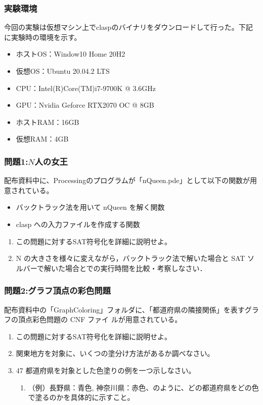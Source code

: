 \documentclass[dvipdfmx]{jsarticle}
\begin{document}
  \subsubsection{実験環境}
  今回の実験は仮想マシン上でclaspのバイナリをダウンロードして行った。下記に実験時の環境を示す。
  \begin{itemize}
    \item ホストOS：Window10 Home 20H2
    \item 仮想OS：Ubuntu 20.04.2 LTS
    \item CPU：Intel(R)Core(TM)i7-9700K @ 3.6GHz
    \item GPU：Nvidia Geforce RTX2070 OC @ 8GB
    \item ホストRAM：16GB
    \item 仮想RAM：4GB
  \end{itemize}
\subsubsection{問題1:$N$人の女王}
配布資料中に、Processingのプログラムが「nQueen.pde」として以下の関数が用意されている。
\begin{itemize}
  \item バックトラック法を用いて nQueen を解く関数
  \item clasp への入力ファイルを作成する関数
\end{itemize}
\begin{enumerate}
  \item この問題に対するSAT符号化を詳細に説明せよ。
  \item N の大きさを様々に変えながら，バックトラック法で解いた場合と SAT ソルバーで解いた場合とでの実行時間を比較・考察しなさい．
\end{enumerate}
\subsubsection{問題2:グラフ頂点の彩色問題}
配布資料中の「GraphColoring」フォルダに、「都道府県の隣接関係」を表すグラフの頂点彩色問題の CNF ファイ
ルが用意されている。
\begin{enumerate}
  \item この問題に対するSAT符号化を詳細に説明せよ。
  \item 関東地方を対象に、いくつの塗分け方法があるか調べなさい。
  \item 47 都道府県を対象とした色塗りの例を一つ示しなさい。
  \begin{enumerate}
    \item （例）長野県：青色, 神奈川県：赤色、のように、どの都道府県をどの色で塗るのかを具体的に示すこと。
  \end{enumerate}
\end{enumerate}
\end{document}
